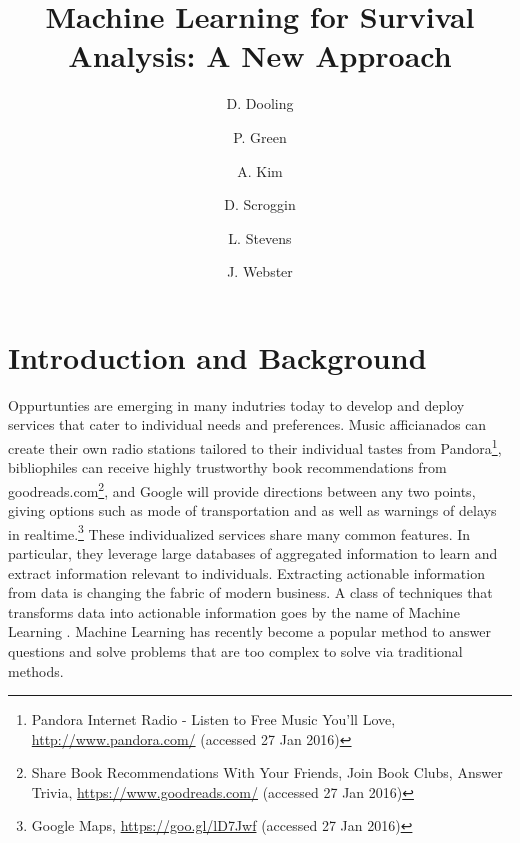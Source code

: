 \documentclass[a4paper,11pt]{article}
\title{Machine Learning for Survival Analysis: A New Approach}
\author{D. Dooling}
\author{P. Green}
\author{A. Kim}
\author{D. Scroggin}
\author{L. Stevens}
\author{J. Webster}
\affiliation{Innovative Oncology Business Solutions, \\
  4901 Lang Ave NE, \\
 Albuquerque, NM 87109, USA}
\begin{document}
 
\maketitle
\flushbottom

\section{Introduction and Background}
\label{sec:intro}


Oppurtunties are emerging in many indutries today to develop and deploy services that cater to individual needs and preferences. Music afficianados can create their own radio stations tailored to their individual tastes from Pandora\footnote{Pandora Internet Radio - Listen to Free Music You'll Love, \url{http://www.pandora.com/} (accessed 27 Jan 2016)}, bibliophiles can receive 
highly trustworthy book recommendations from goodreads.com\footnote{Share Book Recommendations With Your Friends, Join Book Clubs, Answer Trivia, \url{https://www.goodreads.com/} (accessed 27 Jan 2016)}, and Google will provide directions between any two points, giving options such as mode of transportation and as well as warnings of delays in realtime.\footnote{Google Maps, \url{https://goo.gl/lD7Jwf} (accessed 27 Jan 2016)}
These individualized services share many common features. In particular, they leverage large databases of aggregated information to learn and extract information relevant to individuals.  
Extracting actionable information from data is changing the fabric of modern business. A class of techniques that transforms data into actionable information goes by the name of Machine Learning \cite{pythonmachinelearning}.
Machine Learning has recently become a popular method to answer questions and solve problems that are too complex to solve via traditional methods. 
\end{document}
